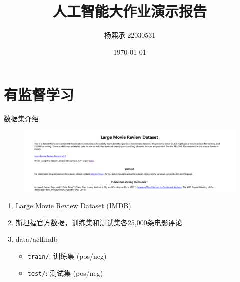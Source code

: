 \documentclass{beamer}
\author{杨熙承 22030531}
\title{人工智能大作业演示报告}
\subtitle{}
\institute{常州工学院~~计信院}
\date{\today}
\begin{document}
\kaishu
\begin{frame}
    \titlepage
\end{frame}

\begin{frame}
    \tableofcontents[sectionstyle=show,subsectionstyle=show/shaded/hide,subsubsectionstyle=show/shaded/hide]
\end{frame}

\section{有监督学习}

\begin{frame}{数据集介绍}
    \vspace{-0.5cm}
    \begin{figure}
        \includegraphics[width=\textwidth]{pic/stanford.png}
        \centering
    \end{figure}
    
    \begin{enumerate}
        \item Large Movie Review Dataset (IMDB)
        \item 斯坦福官方数据，训练集和测试集各25,000条电影评论
        \item data/aclImdb
        \begin{itemize}
            \item \texttt{train/}: 训练集 (pos/neg)
            \item \texttt{test/}: 测试集 (pos/neg)
        \end{itemize}
    \end{enumerate}
\end{frame}
\end{document}
